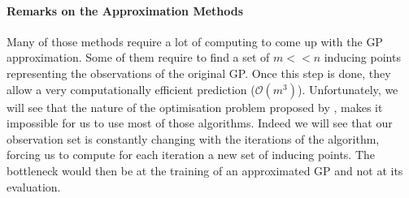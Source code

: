 \paragraph{Remarks on the Approximation Methods}
Many of those methods require a lot of computing to come up with the GP approximation. Some of them require to find a set of $m << n$ inducing points representing the observations of the original GP. Once this step is done, they allow a very computationally efficient prediction ($\mathcal{O}(m^3)$). Unfortunately, we will see that the nature of the optimisation problem proposed by \citet{krause_near-optimal_2008}, makes it impossible for us to use most of those algorithms. Indeed we will see that our observation set is constantly changing with the iterations of the algorithm, forcing us to compute for each iteration a new set of inducing points. The bottleneck would then be at the training of an approximated GP and not at its evaluation. \\
%
%
%


